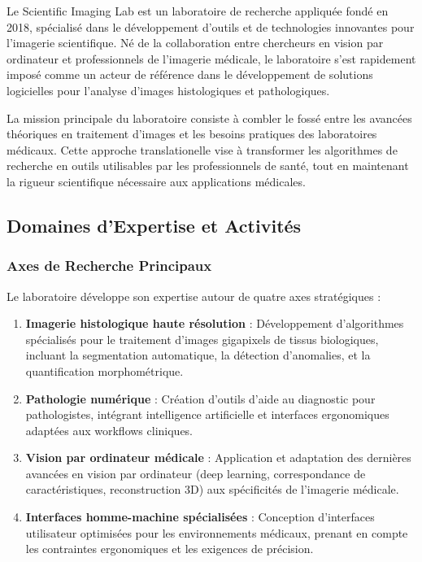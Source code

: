 \documentclass[12pt,a4paper]{report}
\begin{document}
Le Scientific Imaging Lab est un laboratoire de recherche appliquée fondé en 2018, spécialisé dans le développement d'outils et de technologies innovantes pour l'imagerie scientifique. Né de la collaboration entre chercheurs en vision par ordinateur et professionnels de l'imagerie médicale, le laboratoire s'est rapidement imposé comme un acteur de référence dans le développement de solutions logicielles pour l'analyse d'images histologiques et pathologiques.

La mission principale du laboratoire consiste à combler le fossé entre les avancées théoriques en traitement d'images et les besoins pratiques des laboratoires médicaux. Cette approche translationelle vise à transformer les algorithmes de recherche en outils utilisables par les professionnels de santé, tout en maintenant la rigueur scientifique nécessaire aux applications médicales.

\subsection{Domaines d'Expertise et Activités}

\subsubsection{Axes de Recherche Principaux}

Le laboratoire développe son expertise autour de quatre axes stratégiques :

\begin{enumerate}
\item \textbf{Imagerie histologique haute résolution} : Développement d'algorithmes spécialisés pour le traitement d'images gigapixels de tissus biologiques, incluant la segmentation automatique, la détection d'anomalies, et la quantification morphométrique.

\item \textbf{Pathologie numérique} : Création d'outils d'aide au diagnostic pour pathologistes, intégrant intelligence artificielle et interfaces ergonomiques adaptées aux workflows cliniques.

\item \textbf{Vision par ordinateur médicale} : Application et adaptation des dernières avancées en vision par ordinateur (deep learning, correspondance de caractéristiques, reconstruction 3D) aux spécificités de l'imagerie médicale.

\item \textbf{Interfaces homme-machine spécialisées} : Conception d'interfaces utilisateur optimisées pour les environnements médicaux, prenant en compte les contraintes ergonomiques et les exigences de précision.
\end{enumerate}
\end{document}
